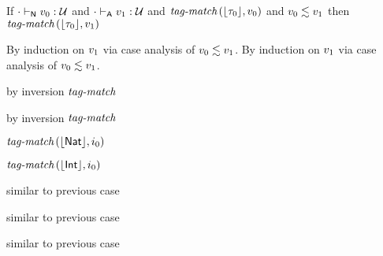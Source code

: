 \begin{lemma}\label{HA-D-compat}
  If\/ ${\cdot} \vdash_{\mathsf{N}} v_0 : {\mathcal U}$
  and\/ ${\cdot} \vdash_{\mathsf{A}} v_1 : {\mathcal U}$
  and\/ $\textit{tag-match}\,(\lfloor \tau_0 \rfloor,v_0)$
  and\/ $v_0 \lesssim v_1$
  then\/ $\textit{tag-match}\,(\lfloor \tau_0 \rfloor,v_1)$
\end{lemma}{
  \newcommand{\shortpf}{By induction on $\svalue_1$ via case analysis of $\rexpr{\svalue_0}{\svalue_1}$.}
\begin{lamportproof*}
  \shortpf
\mainproof
  \shortpf

    \begin{pfproof}
        \begin{pfproof}
          by inversion $\textit{tag-match}$
        \end{pfproof}
        \begin{pfproof}
            \begin{pfproof}
              by inversion $\textit{tag-match}$
            \end{pfproof}
          \qedstep
            \begin{pfproof}
              $\textit{tag-match}\,(\lfloor \mathsf{Nat} \rfloor,i_0)$
            \end{pfproof}
        \end{pfproof}
        \begin{pfproof}
          \qedstep
            \begin{pfproof}
              $\textit{tag-match}\,(\lfloor \mathsf{Int} \rfloor,i_0)$
            \end{pfproof}
        \end{pfproof}
    \end{pfproof}

    \begin{pfproof}
      similar to previous case
    \end{pfproof}

    \begin{pfproof}
      similar to previous case
    \end{pfproof}

    \begin{pfproof}
      similar to previous case
    \end{pfproof}


\end{lamportproof*}}
